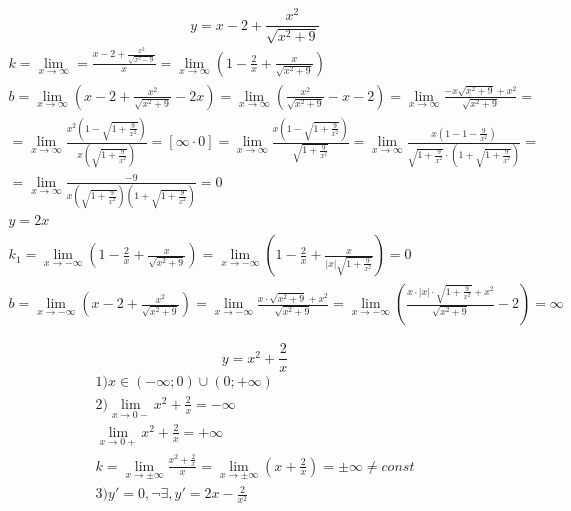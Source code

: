 \documentclass{article}
\begin{document}
\[
    y = x - 2 + \frac{x^2}{\sqrt{x^2 + 9}}
\]
\begin{gather*}
    k = \lim_{x \to \infty} = \frac{x - 2 + \frac{x^2}{\sqrt{x^2 - 9}}}{x} =
    \lim_{x \to \infty} \left( 1 - \frac{2}{x} + \frac{x}{\sqrt{x^2 + 9}} \right) \\
    b = \lim_{x \to \infty} \left( x - 2 + \frac{x^2}{\sqrt{x^2 + 9}} - 2x \right) =
    \lim_{x \to \infty} \left(\frac{x^2}{\sqrt{x^2 + 9}} - x - 2 \right) =
    \lim_{x \to \infty} \frac{-x \sqrt{x^2 + 9} + x^2}{\sqrt{x^2 + 9}} = \\
    = \lim_{x \to \infty} \frac{x^2 \left( 1 - \sqrt{1 + \frac{9}{x^2}} \right)}{x \left( \sqrt{1 + \frac{9}{x^2}} \right)} =
    \left[ \infty \cdot 0 \right] =
    \lim_{x \to \infty }\frac{x \left( 1 - \sqrt{1 + \frac{9}{x^2}} \right)}{\sqrt{1 + \frac{9}{x^2}}} =
    \lim_{x \to \infty} \frac{x \left( 1 - 1 - \frac{9}{x^2} \right)}{\sqrt{1 + \frac{9}{x^2}} \cdot \left( 1 + \sqrt{1 + \frac{9}{x^2}} \right)} = \\
    = \lim_{x \to \infty} \frac{-9}{x \left( \sqrt{1 + \frac{9}{x^2}} \right) \left( 1 + \sqrt{1 + \frac{9}{x^2}} \right)} = 0 \\
    y = 2x \\
    k_1 = \lim_{x \to -\infty} \left( 1 - \frac{2}{x} + \frac{x}{\sqrt{x^2 + 9}} \right) =
    \lim_{x \to -\infty} \left( 1 - \frac{2}{x} + \frac{x}{|x| \sqrt{1 + \frac{9}{x^2}}} \right) = 0 \\
    b = \lim_{x \to -\infty} \left( x - 2 + \frac{x^2}{\sqrt{x^2 + 9}} \right) =
    \lim_{x \to -\infty} \frac{x \cdot \sqrt{x^2 + 9} + x^2}{\sqrt{x^2 + 9}} =
    \lim_{x \to -\infty} \left( \frac{x \cdot |x| \cdot \sqrt{1 + \frac{9}{x^2}} + x^2}{\sqrt{x^2 + 9}} - 2 \right) = \infty
\end{gather*}

\[
    y = x^2 + \frac{2}{x}
\]
\begin{gather*}
    1) x \in (-\infty; 0) \cup (0; +\infty) \\
    2) \lim_{x \to 0-} x^2 + \frac{2}{x} = -\infty \\
       \lim_{x \to 0+} x^2 + \frac{2}{x} = +\infty \\
       k = \lim_{x \to \pm \infty} \frac{x^2 + \frac{2}{x}}{x} =
       \lim_{x \to \pm \infty} \left( x + \frac{2}{x} \right) = \pm \infty \neq const \\
    3) y' = 0, \neg \exists, y' = 2x - \frac{2}{x^2}
\end{gather*}
\end{document}
